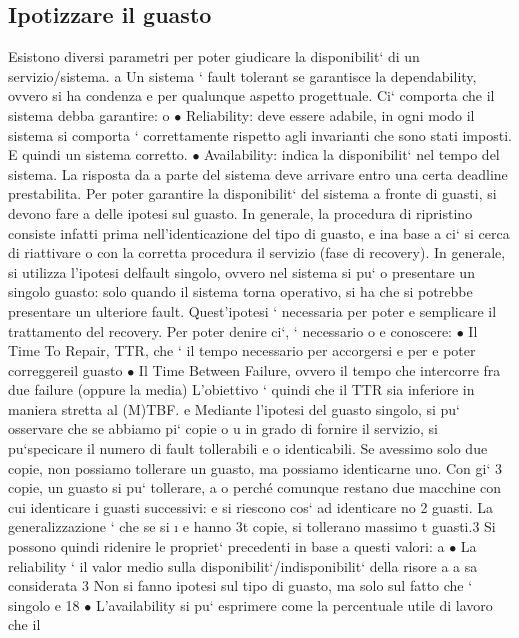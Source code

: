 \documentclass[a4paper,12pt]{article}
\begin{document}
\subsection{Ipotizzare il guasto}
Esistono diversi parametri per poter giudicare la disponibilit` di un servizio/sistema.
a
Un sistema ` fault tolerant se garantisce la dependability, ovvero si ha condenza
e
per qualunque aspetto progettuale. Ci` comporta che il sistema debba garantire:
o
$\bullet$ Reliability: deve essere adabile, in ogni modo il sistema si comporta
`
correttamente rispetto agli invarianti che sono stati imposti. E quindi un
sistema corretto.
$\bullet$ Availability: indica la disponibilit` nel tempo del sistema. La risposta da
a
parte del sistema deve arrivare entro una certa deadline prestabilita.
Per poter garantire la disponibilit` del sistema a fronte di guasti, si devono fare
a
delle ipotesi sul guasto. In generale, la procedura di ripristino consiste infatti
prima nell'identicazione del tipo di guasto, e ina base a ci` si cerca di riattivare
o
con la corretta procedura il servizio (fase di recovery).
In generale, si utilizza l'ipotesi delfault singolo, ovvero nel sistema si pu`
o
presentare un singolo guasto: solo quando il sistema torna operativo, si ha che
si potrebbe presentare un ulteriore fault. Quest'ipotesi ` necessaria per poter
e
semplicare il trattamento del recovery. Per poter denire ci`, ` necessario
o e
conoscere:
$\bullet$ Il Time To Repair, TTR, che ` il tempo necessario per accorgersi e per
e
poter correggereil guasto
$\bullet$ Il Time Between Failure, ovvero il tempo che intercorre fra due failure
(oppure la media)
L'obiettivo ` quindi che il TTR sia inferiore in maniera stretta al (M)TBF.
e
Mediante l'ipotesi del guasto singolo, si pu` osservare che se abbiamo pi` copie
o
u
in grado di fornire il servizio, si pu`specicare il numero di fault tollerabili e
o
identicabili. Se avessimo solo due copie, non possiamo tollerare un guasto,
ma possiamo identicarne uno. Con gi` 3 copie, un guasto si pu` tollerare,
a
o
perché comunque restano due macchine con cui identicare i guasti successivi:
e
si riescono cos` ad identicare no 2 guasti. La generalizzazione ` che se si
\i{}
e
hanno 3t copie, si tollerano massimo t guasti.3 Si possono quindi ridenire le
propriet` precedenti in base a questi valori:
a
$\bullet$ La reliability ` il valor medio sulla disponibilit`/indisponibilit` della risore
a
a
sa considerata
3 Non
si fanno ipotesi sul tipo di guasto, ma solo sul fatto che ` singolo
e
18
$\bullet$ L'availability si pu` esprimere come la percentuale utile di lavoro che il
\end{document}
